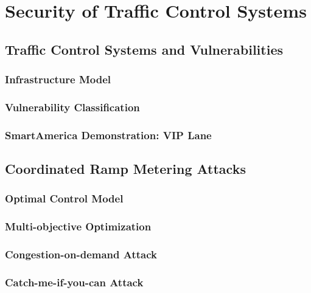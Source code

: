 \chapter{Security of Traffic Control Systems}

\section{Traffic Control Systems and Vulnerabilities}

\subsection{Infrastructure Model}

\subsection{Vulnerability Classification}

\subsection{SmartAmerica Demonstration: VIP Lane}

\section{Coordinated Ramp Metering Attacks}

\subsection{Optimal Control Model}

\subsection{Multi-objective Optimization}

\subsection{Congestion-on-demand Attack}

\subsection{Catch-me-if-you-can Attack}